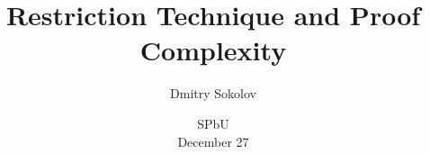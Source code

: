 

\titlegraphic{
    
}


\title[Restriction Technique]{
    Restriction Technique and Proof Complexity
}

\author[Sokolov D.]{
    Dmitry Sokolov
}  


\date{SPbU\\ December 27}

\newcommand{\SPCR}{\PrSys{S}\text{-}\PrSys{PCR}}
\newcommand{\SSOS}{\PrSys{S}\text{-}\PrSys{SOS}}




    \maketitle

    
    
    
    


